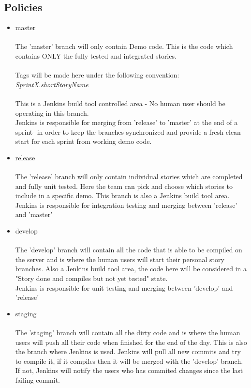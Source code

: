\subsection {Policies}
\begin{itemize}
\item master\\ \\
The 'master' branch will only contain Demo code. This is the code which contains ONLY the fully tested and integrated stories.  \\\\Tags will be made here under the following convention:\\ \emph{SprintX.shortStoryName} \\\\
This is a Jenkins build tool controlled area - No human user should be operating in this branch. \\Jenkins is responsible for  merging from 'release' to 'master' at the end of a sprint- in order to keep the branches synchronized and provide a fresh clean start for each sprint from working demo code.\\
\item release\\ \\
The 'release' branch will only contain individual stories which are completed and fully unit tested. Here the team can pick and choose which stories to include in a specific demo. This branch is also a Jenkins build tool area. \\Jenkins is responsible for integration testing and merging between 'release' and 'master'
\item develop\\ \\
The 'develop' branch will contain all the code that is able to be compiled on the server and is where the human users will start their personal story branches. Also a Jenkins build tool area, the code here will be considered in a "Story done and compiles but not yet tested" state.\\ Jenkins is responsible for unit testing and merging between 'develop' and 'release'

\item staging \\ \\
The 'staging' branch will contain all the dirty code and is where the human users will push all their code when finished for the end of the day. This is also the branch where Jenkins is used. Jenkins will pull all new commits and try to compile it, if it compiles then it will be merged with the 'develop' branch. If not, Jenkins will notify the users who has commited changes since the last failing commit.


\end{itemize}
